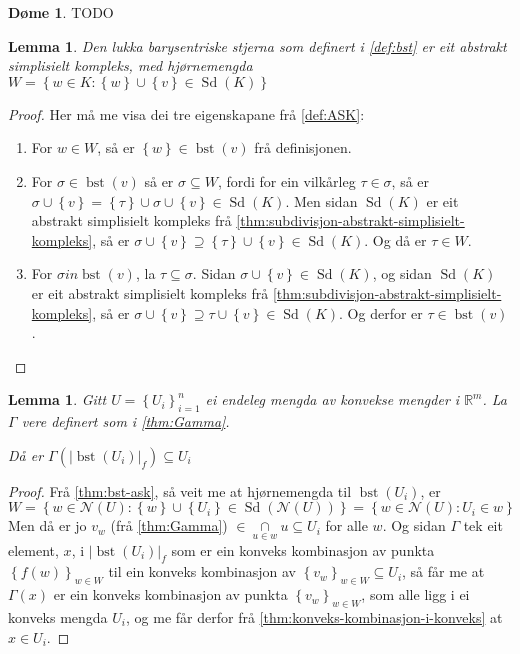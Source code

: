 \documentclass[a4paper, titlepage, 12pt, norsk]{article}
\theoremstyle{plain}
\newtheorem{lemma}[theorem]{Lemma}
\theoremstyle{definition}
\newtheorem{example}[theorem]{Døme}
\newcommand{\Rb}{\mathbb{R}}
\newcommand{\Nc}{\mathcal{N}}
\newcommand{\intersect}{ \mathop{\cap}\limits } %
\newcommand{\union}{ \mathop{\cup}\limits }
\newcommand{\gr}[1]{ \lvert #1 \rvert } %
\newcommand{\set}[1]{ \left \{ #1 \right \} } %
\DeclareMathOperator{\Sd}{Sd}
\DeclareMathOperator{\bst}{bst}
\begin{document}
\begin{example}
	TODO
\end{example}

\begin{lemma} \label{thm:bst-ask}
	Den lukka barysentriske stjerna som definert i \autoref{def:bst} er eit abstrakt simplisielt kompleks, med hjørnemengda \( W = \set{w \in K : \set{w} \union \set{v} \in \Sd(K)} \)
\end{lemma}

\begin{proof}
	Her må me visa dei tre eigenskapane frå \autoref{def:ASK}:
	\begin{enumerate}
		\item{For \( w \in W \), så er \( \set{w} \in \bst(v) \) frå definisjonen.}
  		\item{For \( \sigma \in \bst(v) \) så er \( \sigma \subseteq W \), fordi for ein vilkårleg \( \tau \in \sigma \), så er \( \sigma \union \set{v} = \set{\tau} \union \sigma \union \set{v} \in \Sd(K) \). Men sidan \( \Sd(K) \) er eit abstrakt simplisielt kompleks frå \autoref{thm:subdivisjon-abstrakt-simplisielt-kompleks}, så er \( \sigma \union \set{v} \supseteq \set{\tau} \union \set{v} \in \Sd(K) \). Og då er \( \tau \in W \).}
    	\item{For \( \sigma in \bst(v) \), la \( \tau \subseteq \sigma \). Sidan \( \sigma \union \set{v} \in \Sd(K) \), og sidan \( \Sd(K) \) er eit abstrakt simplisielt kompleks frå \autoref{thm:subdivisjon-abstrakt-simplisielt-kompleks}, så er \( \sigma \union \set{v} \supseteq \tau \union \set{v} \in \Sd(K) \). Og derfor er \( \tau \in \bst(v) \).}
	\end{enumerate}
\end{proof}

\begin{lemma} \label{thm:Gamma-inni-ui}
	Gitt \( U = \set{U_i}_{i=1}^n \) ei endeleg mengda av konvekse mengder i \( \Rb^m \). La \( \Gamma \) vere definert som i \autoref{thm:Gamma}.

	Då er \( \Gamma(\gr{\bst(U_i)}_f) \subseteq U_i \)
\end{lemma}

\begin{proof}
	Frå \autoref{thm:bst-ask}, så veit me at hjørnemengda til \( \bst(U_i) \), er
	\[
		W = \set{w \in \Nc(U) : \set{w} \union \set{U_i} \in \Sd(\Nc(U))}=\set{w \in \Nc(U) : U_i \in w}
	\] 
	Men då er jo \( v_w \) (frå \autoref{thm:Gamma}) \( \in \intersect_{u \in w} u \subseteq U_i \) for alle \( w \). Og sidan \( \Gamma \) tek eit element, \( x \), i \( \gr{\bst(U_i)}_f \) som er ein konveks kombinasjon av punkta \( \set{f(w)}_{w \in W} \) til ein konveks kombinasjon av \( \set{v_w}_{w \in W} \subseteq U_i \), så får me at \( \Gamma(x) \) er ein konveks kombinasjon av punkta \( \set{v_w}_{w \in W} \), som alle ligg i ei konveks mengda \( U_i \), og me får derfor frå \autoref{thm:konveks-kombinasjon-i-konveks} at \( x \in U_i \).
\end{proof}
\end{document}
